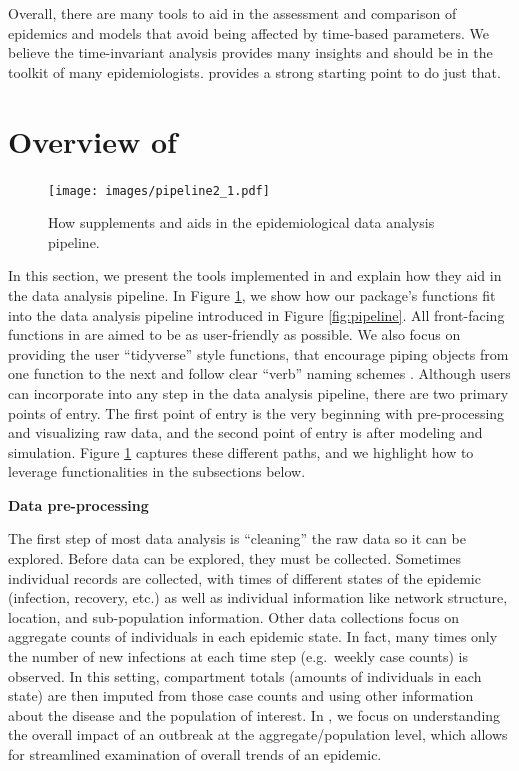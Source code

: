 \documentclass[
  shortnames]{jss}
\begin{document}
Overall, there are many tools to aid in the assessment and comparison of
epidemics and models that avoid being affected by time-based parameters.
We believe the time-invariant analysis provides many insights and should
be in the toolkit of many epidemiologists.  provides a
strong starting point to do just that.

\section[Package overview]{Overview of
}\label{sec:overview}

\afterpage{\clearpage}
\begin{figure}
    \centering
    \texttt{[image: images/pipeline2\_1.pdf]}
    \caption{How  supplements and aids in the epidemiological data analysis pipeline.}
    \label{fig:pipeline2}
\end{figure}

In this section, we present the tools implemented in 
and explain how they aid in the data analysis pipeline. In Figure
\ref{fig:pipeline2}, we show how our package's functions fit into the
data analysis pipeline introduced in Figure \ref{fig:pipeline}. All
front-facing functions in  are aimed to be as
user-friendly as possible. We also focus on providing the user
``tidyverse'' style functions, that encourage piping objects from one
function to the next and follow clear ``verb'' naming schemes
\citep{Wickham2019}. Although users can incorporate 
into any step in the data analysis pipeline, there are two primary
points of entry. The first point of entry is the very beginning with
pre-processing and visualizing raw data, and the second point of entry
is after modeling and simulation. Figure \ref{fig:pipeline2} captures
these different paths, and we highlight how to leverage 
functionalities in the subsections below.

\textbf{Data pre-processing}

The first step of most data analysis is ``cleaning'' the raw data so it
can be explored. Before data can be explored, they must be collected.
Sometimes individual records are collected, with times of different
states of the epidemic (infection, recovery, etc.) as well as individual
information like network structure, location, and sub-population
information. Other data collections focus on aggregate counts of
individuals in each epidemic state. In fact, many times only the number
of new infections at each time step (e.g.~weekly case counts) is
observed. In this setting, compartment totals (amounts of individuals in
each state) are then imputed from those case counts and using other
information about the disease and the population of interest. In
, we focus on understanding the overall impact of an
outbreak at the aggregate/population level, which allows for streamlined
examination of overall trends of an epidemic.
\end{document}
